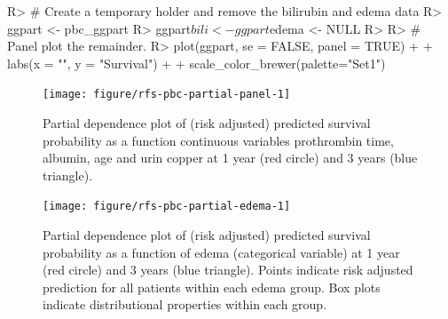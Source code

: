 \documentclass[nojss]{jss}\usepackage[]{graphicx}\usepackage[]{color}
\begin{document}
\begin{Schunk}
\begin{Sinput}
R> # Create a temporary holder and remove the bilirubin and edema data
R> ggpart <- pbc_ggpart
R> ggpart$bili <- ggpart$edema <- NULL
R> 
R> # Panel plot the remainder.
R> plot(ggpart, se = FALSE, panel = TRUE) + 
+   labs(x = "", y = "Survival") +
+   scale_color_brewer(palette="Set1")
\end{Sinput}
\begin{figure}[!htpb]

{\centering \texttt{[image: figure/rfs-pbc-partial-panel-1]} 

}

\caption[Partial dependence plot of (risk adjusted) predicted survival probability as a function continuous variables prothrombin time, albumin, age and urin copper at 1 year (red circle) and 3 years (blue triangle)]{Partial dependence plot of (risk adjusted) predicted survival probability as a function continuous variables prothrombin time, albumin, age and urin copper at 1 year (red circle) and 3 years (blue triangle).\label{fig:pbc-partial-panel}}
\end{figure}
\end{Schunk}

\begin{Schunk}
\begin{figure}[!htpb]

{\centering \texttt{[image: figure/rfs-pbc-partial-edema-1]} 

}

\caption[Partial dependence plot of (risk adjusted) predicted survival probability as a function of edema (categorical variable) at 1 year (red circle) and 3 years (blue triangle)]{Partial dependence plot of (risk adjusted) predicted survival probability as a function of edema (categorical variable) at 1 year (red circle) and 3 years (blue triangle). Points indicate risk adjusted prediction for all patients within each edema group. Box plots indicate distributional properties within each group.\label{fig:pbc-partial-edema}}
\end{figure}
\end{Schunk}
\end{document}
